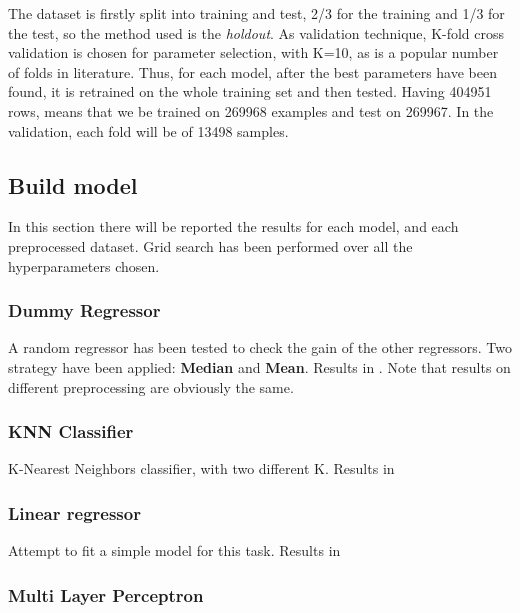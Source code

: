 The dataset is firstly split into training and test, 2/3 for the training and 1/3 for the test, so the method used is the \textit{holdout}. 
As validation technique, K-fold cross validation is chosen for parameter selection, with K=10, as is a popular number of folds in literature.
Thus, for each model, after the best parameters have been found, it is retrained on the whole training set and then tested.
Having 404951 rows, means that we be trained on 269968 examples and test on 269967. In the validation, each fold will be of 13498 samples.

\subsection{Build model}

In this section there will be reported the results for each model, and each preprocessed dataset.
Grid search has been performed over all the hyperparameters chosen.


\subsubsection{Dummy Regressor}

A random regressor has been tested to check the gain of the other regressors. Two strategy have been applied: \textbf{Median} and \textbf{Mean}. Results in .
Note that results on different preprocessing are obviously the same.



\subsubsection{KNN Classifier}

K-Nearest Neighbors classifier, with two different K. Results in 



\subsubsection{Linear regressor}

Attempt to fit a simple model for this task. Results in 




\subsubsection{Multi Layer Perceptron}

